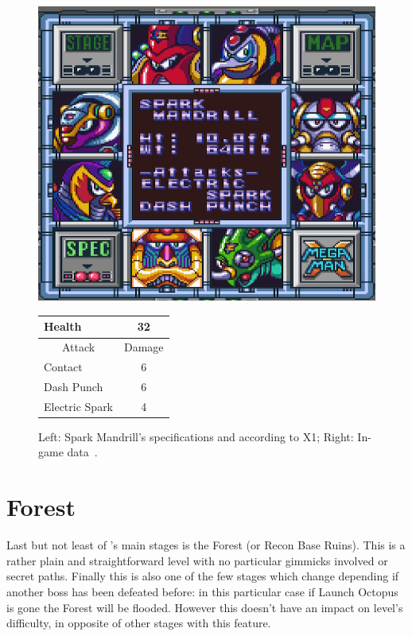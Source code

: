 \begin{figure}[htp]
	\begin{minipage}[c]{0.45\linewidth}
		\vspace{0pt}
		\centering
		\includegraphics[width=\linewidth]{figures/X1/Spark_mandrill/Spark_mandril_specs.png}
	\end{minipage}
	\begin{minipage}[c]{0.45\linewidth}
		\centering
		\vspace{0pt}
		\begin{tabular}[h]{l c}
			\toprule
			Health  & 32\\
			\midrule
			\multicolumn{1}{c}{Attack} & \multicolumn{1}{c}{Damage}\\
			Contact & 6\\
			Dash Punch& 6\\
			Electric Spark & 4\\
			\bottomrule
		\end{tabular}
	\end{minipage}
	\caption{Left: Spark Mandrill's specifications and according to X1; Right: In-game data~\cite{wiki:Spark_mandrill}. }
	\label{Mandrill_specs}
\end{figure}

\section{Forest}
Last but not least of \x's main stages is the Forest (or Recon Base Ruins). This is a rather plain and straightforward level with no particular gimmicks involved or secret paths. Finally this is also one of the few stages which change depending if another boss has been defeated before: in this particular case if Launch Octopus is gone the Forest will be flooded. However this doesn't have an impact on level's difficulty, in opposite of other stages with this feature.

